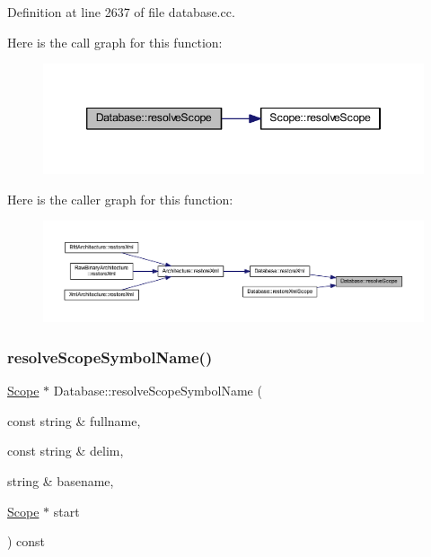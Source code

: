 Definition at line 2637 of file database.\+cc.

Here is the call graph for this function\+:
\nopagebreak
\begin{figure}[H]
\begin{center}
\leavevmode
\includegraphics[width=346pt]{class_database_a452ac8a13c82d53b20606b18202475ae_cgraph}
\end{center}
\end{figure}
Here is the caller graph for this function\+:
\nopagebreak
\begin{figure}[H]
\begin{center}
\leavevmode
\includegraphics[width=350pt]{class_database_a452ac8a13c82d53b20606b18202475ae_icgraph}
\end{center}
\end{figure}
\mbox{\label{class_database_abb1a4058854788e2847653526a458414}} 
\subsubsection{\texorpdfstring{resolveScopeSymbolName()}{resolveScopeSymbolName()}}
{\footnotesize\ttfamily \mbox{\hyperlink{class_scope}{Scope}} $\ast$ Database\+::resolve\+Scope\+Symbol\+Name (\begin{DoxyParamCaption}\item[{const string \&}]{fullname,  }\item[{const string \&}]{delim,  }\item[{string \&}]{basename,  }\item[{\mbox{\hyperlink{class_scope}{Scope}} $\ast$}]{start }\end{DoxyParamCaption}) const}



